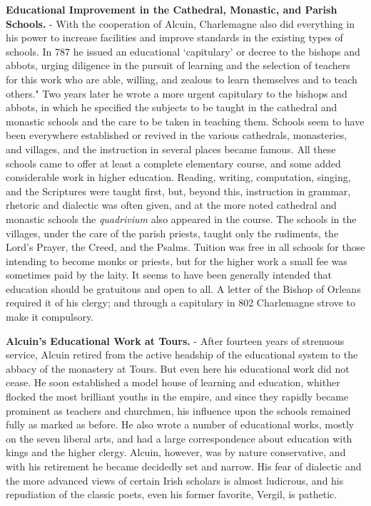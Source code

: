 \documentclass[]{book}
\begin{document}
\textbf{Educational Improvement in the Cathedral, Monastic, and Parish Schools.} - With the cooperation of Alcuin, Charlemagne also did everything in his power to increase facilities and improve standards in the existing types of schools. In 787 he issued an educational `capitulary' or decree to the bishops and abbots, urging diligence in the pursuit of learning and the selection of teachers for this work who are able, willing, and zealous to learn themselves and to teach others." Two years later he wrote a more urgent capitulary to the bishops and abbots, in which he specified the subjects to be taught in the cathedral and monastic schools and the care to be taken in teaching them. Schools seem to have been everywhere established or revived in the various cathedrals, monasteries, and villages, and the instruction in several places became famous. All these schools came to offer at least a complete elementary course, and some added considerable work in higher education. Reading, writing, computation, singing, and the Scriptures were taught first, but, beyond this, instruction in grammar, rhetoric and dialectic was often given, and at the more noted cathedral and monastic schools the \emph{quadrivium} also appeared in the course. The schools in the villages, under the care of the parish priests, taught only the rudiments, the Lord's Prayer, the Creed, and the Psalms. Tuition was free in all schools for those intending to become monks or priests, but for the higher work a small fee was sometimes paid by the laity. It seems to have been generally intended that education should be gratuitous and open to all. A letter of the Bishop of Orleans required it of his clergy; and through a capitulary in 802 Charlemagne strove to make it compulsory.

\textbf{Alcuin's Educational Work at Tours.} - After fourteen years of strenuous service, Alcuin retired from the active headship of the educational system to the abbacy of the monastery at Tours. But even here his educational work did not cease. He soon established a model house of learning and education, whither flocked the most brilliant youths in the empire, and since they rapidly became prominent as teachers and churchmen, his influence upon the schools remained fully as marked as before. He also wrote a number of educational works, mostly on the seven liberal arts, and had a large correspondence about education with kings and the higher clergy. Alcuin, however, was by nature conservative, and with his retirement he became decidedly set and narrow. His fear of dialectic and the more advanced views of certain Irish scholars is almost ludicrous, and his repudiation of the classic poets, even his former favorite, Vergil, is pathetic.
\end{document}
